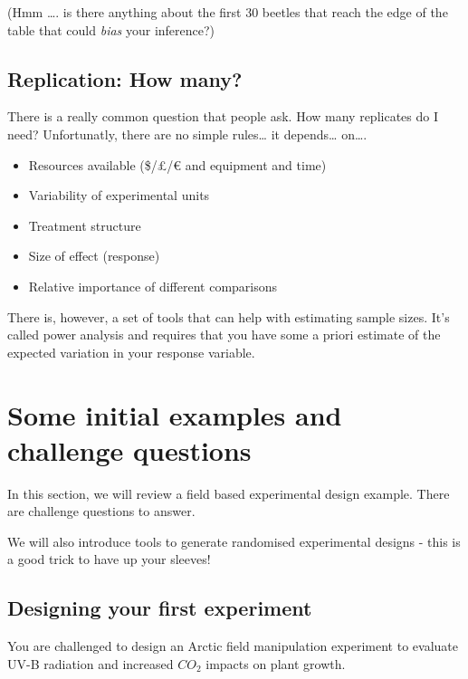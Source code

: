 \documentclass[
]{book}
\providecommand{\tightlist}{%
  \setlength{\itemsep}{0pt}\setlength{\parskip}{0pt}}
\begin{document}
(Hmm \ldots. is there anything about the first 30 beetles that reach the edge of the table that could \emph{bias} your inference?)

\hypertarget{replication-how-many}{%
\section{Replication: How many?}\label{replication-how-many}}

There is a really common question that people ask. How many replicates do I need? Unfortunatly, there are no simple rules\ldots{} it depends\ldots{} on\ldots.

\begin{itemize}
\tightlist
\item
  Resources available (\$/£/€ and equipment and time)
\item
  Variability of experimental units
\item
  Treatment structure
\item
  Size of effect (response)
\item
  Relative importance of different comparisons
\end{itemize}

There is, however, a set of tools that can help with estimating sample sizes. It's called power analysis and requires that you have some a priori estimate of the expected variation in your response variable.

\hypertarget{some-initial-examples-and-challenge-questions}{%
\chapter{Some initial examples and challenge questions}\label{some-initial-examples-and-challenge-questions}}

In this section, we will review a field based experimental design example. There are challenge questions to answer.

We will also introduce tools to generate randomised experimental designs - this is a good trick to have up your sleeves!

\hypertarget{designing-your-first-experiment}{%
\section{Designing your first experiment}\label{designing-your-first-experiment}}

You are challenged to design an Arctic field manipulation experiment to evaluate UV-B radiation and increased \(CO_{2}\) impacts on plant growth.
\end{document}
